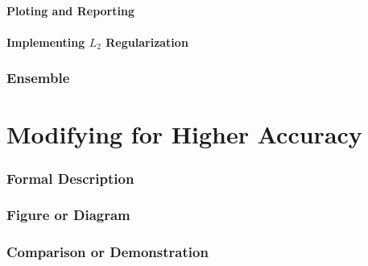 \documentclass{article}
\begin{document}
    \subsection{Ploting and Reporting}
    \subsection{Implementing $L_2$ Regularization}

    \pagebreak

    \section{Ensemble}

    \pagebreak

    \part{Modifying for Higher Accuracy}
    \section{Formal Description}
    \section{Figure or Diagram}
    \section{Comparison or Demonstration}
\end{document}
